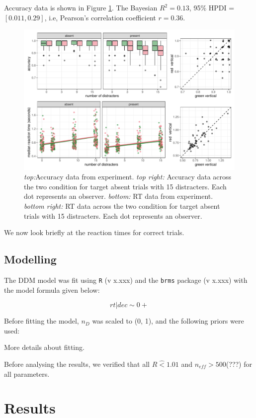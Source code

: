 \documentclass[11pt, twoside, twocolumn]{article}
\begin{document}
Accuracy data is shown in Figure \ref{fig:lvl3_emp}. The Bayesian $R^2 = 0.13$, 95\% HPDI = $[0.011, 0.29]$, i.e, Pearson's correlation coefficient $r = 0.36$.

\begin{figure}
\centering
\includegraphics[width=\linewidth]{figs/exp_lvl_3_emp.pdf}
\caption{\textit{top:}Accuracy data from experiment. \textit{top right:} Accuracy data across the two condition for target absent trials with 15 distracters. Each dot represents an observer. \textit{bottom:} RT data from experiment. \textit{bottom right:} RT data across the two condition for target absent trials with 15 distracters. Each dot represents an observer.}
\label{fig:lvl3_emp}
\end{figure}

We now look briefly at the reaction times for correct trials. 

\subsection{Modelling}

The DDM model was fit using \texttt{R} (v x.xxx) and the \texttt{brms} package (v x.xxx) with the model formula given below:

$$rt | dec \sim 0 + $$

Before fitting the model, $n_D$ was scaled to (0, 1), and the following priors were used:

More details about fitting. 

Before analysing the results, we verified that all $R\hat < 1.01$ and $n_{eff}>500$(???) for all parameters. 

\section{Results}
\end{document}
